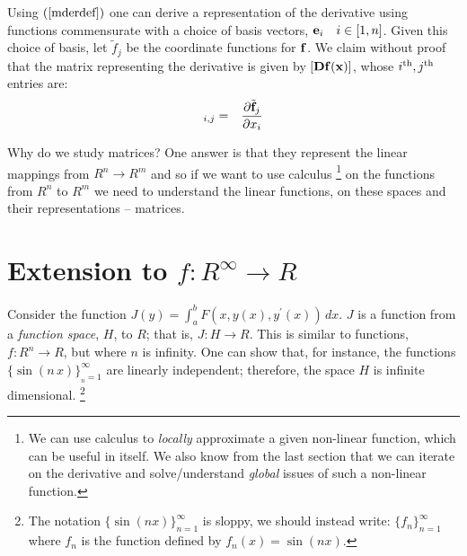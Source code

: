 \documentclass{article}
\begin{document}
Using $(\ref{mderdef})$ one can derive a representation of the derivative 
using functions 
commensurate with a choice of basis vectors, ${\bf e}_i \quad i \in [1, n]$. Given
this choice of basis, let ${\tilde f}_j$ be the coordinate functions for ${\bf f}$.
We claim without proof that the matrix representing the derivative is given by
$[{\bf Df}({\bf x})]$, whose $i^{\rm th}, j^{\rm th}$ entries are:
\begin{eqnarray}
  [{\bf Df}(x)]_{i,j} & = & \frac{\partial {\tilde {\bf f}}_j}{\partial x_i}
\end{eqnarray}

Why do we study matrices? One answer is that they represent the linear mappings
from $R^n \rightarrow R^m$ and so if we want to use calculus%
\footnote{We can use calculus to {\em locally\/} approximate a given non-linear function,
which can be useful in itself. We also know from the last section that we can 
iterate on the derivative and solve/understand {\em global\/} issues of such a non-linear function.}
on the functions
from $R^n$ to $R^m$ we need to understand the linear functions, on these
spaces and their representations -- matrices.

\section{Extension to $f:R^\infty \rightarrow R$}
Consider the function $J(y) = \int_{a}^b F(x, y(x), y^\prime(x)) \, dx$. $J$ is
a function from a {\em function space\/}, $H$, to $R$; that is, $J: H \rightarrow R$.
This is similar to functions,
$f:R^n \rightarrow R$, but where $n$ is infinity. One can show that, for instance, the
functions $\{\sin(n\, x)\}_{_n=1}^\infty$ are linearly independent; therefore,
the space $H$ is infinite dimensional.%
\footnote{The notation $\{\sin(n x)\}_{n=1}^\infty$ is sloppy, we should instead write:
$\{f_n\}_{n=1}^\infty$ where $f_n$ is the function defined by $f_n(x) = \sin(n x)$.}
\end{document}
